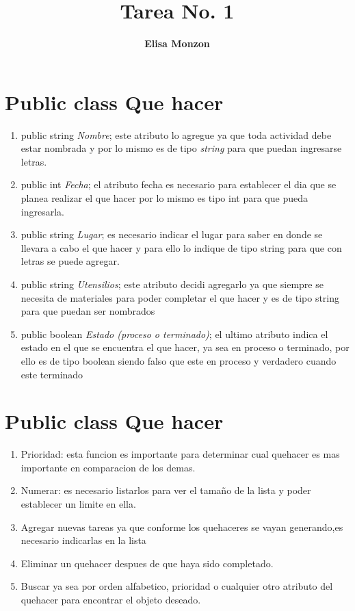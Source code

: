 \documentclass{article}
\author{\textbf{Elisa Monzon}}
\title{Tarea No. 1}
\begin{document}
\maketitle
\section{Public class Que hacer}
\begin{enumerate}
\item public string \emph{Nombre};
este atributo lo agregue ya que toda actividad debe estar nombrada y por lo mismo es de tipo \emph{string} para que puedan ingresarse letras.
\item public int \emph{Fecha};
el atributo fecha es necesario para establecer el dia que se planea realizar el que hacer por lo mismo es tipo int para que pueda ingresarla.
\item public string \emph{Lugar};
es necesario indicar el lugar para saber en donde se llevara a cabo el que hacer y para ello lo indique de tipo string para que con letras se puede agregar.
\item public string \emph{Utensilios};
este atributo decidi agregarlo ya que siempre se necesita de materiales para poder completar el que hacer y es de tipo string para que puedan ser nombrados
\item public boolean \emph{Estado (proceso o terminado)};
el ultimo atributo indica el estado en el que se encuentra el que hacer, ya sea en proceso o terminado, por ello es de tipo boolean siendo falso que este en proceso y verdadero cuando este terminado
\end{enumerate}
\section{Public class Que hacer}
\begin{enumerate}
\item Prioridad: esta funcion es importante para determinar cual quehacer es mas importante en comparacion de los demas.
\item Numerar: es necesario listarlos para ver el tamaño de la lista y poder establecer un limite en ella.
\item Agregar nuevas tareas ya que conforme los quehaceres se vayan generando,es necesario indicarlas en la lista
\item Eliminar un quehacer despues de que haya sido completado.
\item Buscar ya sea por orden alfabetico, prioridad o cualquier otro atributo del quehacer para encontrar el objeto deseado.

\end{enumerate}
\end{document}
